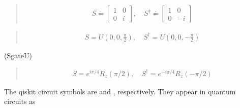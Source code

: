 \documentclass[letterpaper,10pt,english]{jupyterBook}
\begin{document}
\sphinxAtStartPar
{}
\begin{quote}
\begin{equation}\label{equation:q1gates/s:Sgate-matrix}
\begin{split}
S \doteq \begin{bmatrix} 1 & 0 \\ 0 & i \end{bmatrix}, \quad S^\dagger \doteq \begin{bmatrix} 1 & 0 \\ 0 & -i \end{bmatrix}
\end{split}
\end{equation}\end{quote}

\sphinxAtStartPar
{}
\begin{quote}
\begin{equation*}
\begin{split}
S = U\left(0,0,\frac{\pi}{2}\right), \quad S^\dagger = U\left(0,0,-\frac{\pi}{2}\right)
\end{split}
\end{equation*}\end{quote}

\sphinxAtStartPar
(Sgate\sphinxhyphen{}U)

\sphinxAtStartPar
{}
\begin{quote}
\begin{equation*}
\begin{split}
S = e^{i\pi/4} R_z (\pi/2), \quad S^\dagger = e^{-i\pi/4} R_z (-\pi/2)
\end{split}
\end{equation*}\end{quote}

\sphinxAtStartPar
The qiskit circuit symbols are   and , respectively. They appear in quantum circuits as
\end{document}
